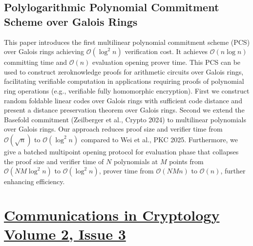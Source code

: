 \documentclass[11pt,oneside]{book}
\theoremstyle{definition}
\theoremstyle{remark}
\theoremstyle{plain}
\begin{document}
\section{\cite{10.1007/978-3-032-07891-9_21} Polylogarithmic Polynomial Commitment Scheme over Galois Rings}
This paper introduces the first multilinear polynomial commitment scheme (PCS) over Galois rings achieving $\mathcal{O}\left(\log ^2 n\right)$ verification cost. It achieves $\mathcal{O}(n \log n)$ committing time and $\mathcal{O}(n)$ evaluation opening prover time. This PCS can be used to construct zeroknowledge proofs for arithmetic circuits over Galois rings, facilitating verifiable computation in applications requiring proofs of polynomial ring operations (e.g., verifiable fully homomorphic encryption). First we construct random foldable linear codes over Galois rings with sufficient code distance and present a distance preservation theorem over Galois rings. Second we extend the Basefold commitment (Zeilberger et al., Crypto 2024) to multilinear polynomials over Galois rings. Our approach reduces proof size and verifier time from $\mathcal{O}(\sqrt{n})$ to $\mathcal{O}\left(\log ^2 n\right)$ compared to Wei et al., PKC 2025. Furthermore, we give a batched multipoint opening protocol for evaluation phase that collapses the proof size and verifier time of $N$ polynomials at $M$ points from $\mathcal{O}\left(N M \log ^2 n\right)$ to $\mathcal{O}\left(\log ^2 n\right)$, prover time from $\mathcal{O}(N M n)$ to $\mathcal{O}(n)$, further enhancing efficiency.


\chapter{\href{https://cic.iacr.org/i/2/3}{Communications in Cryptology Volume 2, Issue 3}}
\end{document}
